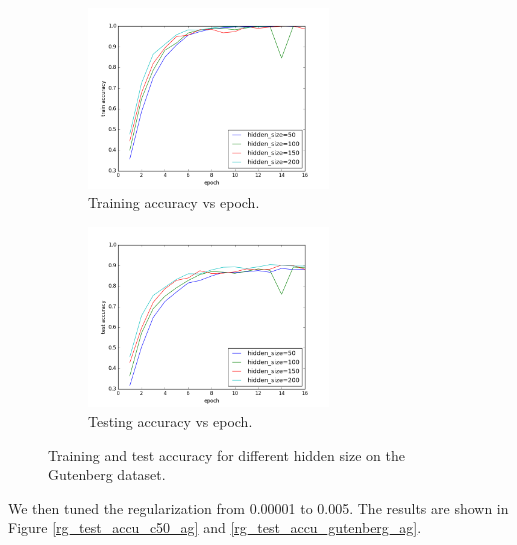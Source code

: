 \documentclass{article} %
\begin{document}
\begin{figure}[H]
\begin{subfigure}{0.5\linewidth}
\centering
\includegraphics[width=0.7\textwidth]{figures/epoch_train_accu_hs_g.png} 
\caption{Training accuracy vs epoch.}
\end{subfigure}
\begin{subfigure}{0.5\linewidth}
\centering
\includegraphics[width=0.7\textwidth]{figures/epoch_test_accu_hs_g.png} 
\caption{Testing accuracy vs epoch.}
\end{subfigure}
\caption{Training and test accuracy for different hidden size on the Gutenberg dataset.}
\label{hs_test_accu_gutenberg_ag}
\end{figure}
%
We then tuned the regularization from 0.00001 to 0.005. The results are shown in Figure \ref{rg_test_accu_c50_ag} and \ref{rg_test_accu_gutenberg_ag}.
\end{document}
